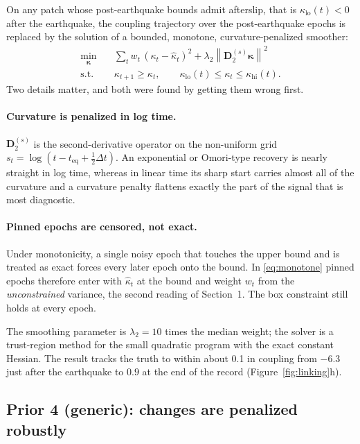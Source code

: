 \documentclass[11pt]{article}
\newcommand{\vect}[1]{\bm{#1}}
\newcommand{\mat}[1]{\mathbf{#1}}
\newcommand{\norm}[1]{\left\lVert #1 \right\rVert}
\begin{document}
On any patch whose post-earthquake bounds admit afterslip, that is $\kappa_{\mathrm{lo}}(t) < 0$ after the earthquake, the coupling trajectory over the post-earthquake epochs is replaced by the solution of a bounded, monotone, curvature-penalized smoother:
\begin{equation}
\begin{aligned}
\min_{\vect{\kappa}}\quad & \sum_t w_t\,(\kappa_t - \hat{\kappa}_t)^2 + \lambda_2 \norm{\mat{D}_2^{(s)} \vect{\kappa}}^2 \\
\text{s.t.}\quad & \kappa_{t+1} \ge \kappa_t, \qquad \kappa_{\mathrm{lo}}(t) \le \kappa_t \le \kappa_{\mathrm{hi}}(t).
\end{aligned}
\label{eq:monotone}
\end{equation}
Two details matter, and both were found by getting them wrong first.

\paragraph{Curvature is penalized in log time.} $\mat{D}_2^{(s)}$ is the second-derivative operator on the non-uniform grid $s_t = \log(t - t_{\mathrm{eq}} + \tfrac{1}{2}\Delta t)$. An exponential or Omori-type recovery is nearly straight in log time, whereas in linear time its sharp start carries almost all of the curvature and a curvature penalty flattens exactly the part of the signal that is most diagnostic.

\paragraph{Pinned epochs are censored, not exact.} Under monotonicity, a single noisy epoch that touches the upper bound and is treated as exact forces every later epoch onto the bound. In \eqref{eq:monotone} pinned epochs therefore enter with $\hat{\kappa}_t$ at the bound and weight $w_t$ from the \emph{unconstrained} variance, the second reading of Section~1. The box constraint still holds at every epoch.

The smoothing parameter is $\lambda_2 = 10$ times the median weight; the solver is a trust-region method for the small quadratic program with the exact constant Hessian. The result tracks the truth to within about 0.1 in coupling from $-6.3$ just after the earthquake to $0.9$ at the end of the record (Figure~\ref{fig:linking}h).

\subsection{Prior 4 (generic): changes are penalized robustly}
\end{document}
